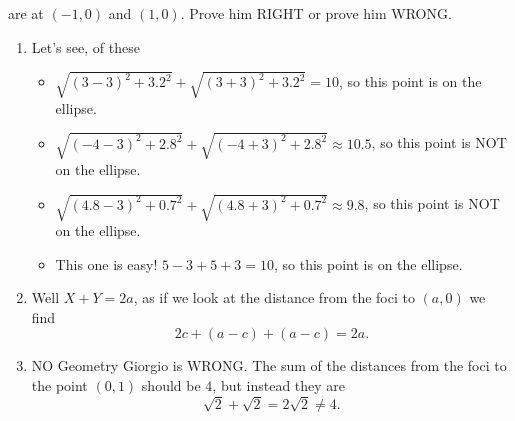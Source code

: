 \documentclass[nooutcomes,noauthor,handout]{ximera}
\begin{document}
\begin{question}
\begin{enumerate}
\begin{center}
      \end{center}
      are at $(-1,0)$ and $(1,0)$. Prove him RIGHT or prove him WRONG.
  \end{enumerate}
  \begin{freeResponse}
    \begin{enumerate}
    \item Let's see, of these
      \begin{itemize}
      \item $\sqrt{(3-3)^2+3.2^2} + \sqrt{(3+3)^2 + 3.2^2} = 10$, so this point is on the ellipse.
      \item $\sqrt{(-4-3)^2+2.8^2} + \sqrt{(-4+3)^2 + 2.8^2} \approx 10.5$, so this point is NOT on the ellipse.
      \item $\sqrt{(4.8-3)^2+0.7^2} + \sqrt{(4.8+3)^2 + 0.7^2} \approx 9.8$, so this point is NOT on the ellipse.
      \item This one is easy! $5-3+5+3 = 10$, so this point is on the ellipse.
      \end{itemize}
    \item Well $X+Y=2a$, as if we look at the distance from the foci to $(a,0)$ we find
      \[
      2c + (a-c) + (a-c) = 2a.
      \]
    \item NO Geometry Giorgio is WRONG. The sum of the distances from
      the foci to the point $(0,1)$ should be $4$, but instead they
      are
      \[
      \sqrt{2} + \sqrt{2} = 2\sqrt{2} \ne 4.
      \]
    \end{enumerate}
  \end{freeResponse}
\end{question}
\mynewpage
\end{document}
